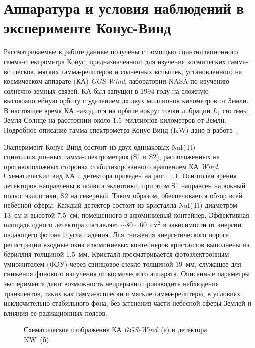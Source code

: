 \chapter{Аппаратура и условия наблюдений в эксперименте Конус-Винд}\label{KW_description}

Рассматриваемые в работе данные получены с помощью сцинтилляционного гамма-спектрометра 
Конус, предназначенного для изучения космических гамма-всплесков, мягких гамма-репитеров и солнечных вспышек,
установленного на космическом аппарате (КА) \textit{GGS-Wind}, лаборатории NASA по изучению 
солнечно-земных связей. КА был запущен в 1994 году на сложную высокоапогейную орбиту 
с удалением до двух миллионов километров от Земли. В настоящее время КА находится 
на орбите вокруг точки либрации $L_1$ системы Земля-Солнце на расстоянии около 1.5~миллионов километров от Земли.
Подробное описание гамма-спектрометра Конус-Винд (KW) дано в работе~\citep{Aptekar_1995SSR}.

Эксперимент Конус-Винд состоит из двух одинаковых NaI(Tl) сцинтилляционных 
гамма-спектрометров (S1 и S2), расположенных на противоположных сторонах 
стабилизированного вращением КА \textit{Wind}. 
Схематический вид КА и детектора приведён на рис.~\ref{img:KW_main_view}.
Оси полей зрения детекторов 
направлены в полюса эклиптики, при этом S1 направлен на южный полюс эклиптики, 
S2 на северный. Таким образом, обеспечивается обзор всей небесной сферы. 
Каждый детектор состоит из кристалла NaI(Tl) диаметром 13~см и высотой 7.5~см, 
помещенного в алюминиевый контейнер.
Эффективная площадь одного детектора составляет $\sim 80\textrm{--}160$~см$^2$ в 
зависимости от энергии падающего фотона и угла падения.  
Для снижения энергетического порога регистрации входные окна алюминиевых 
контейнеров кристаллов выполнены из бериллия толщиной 1.5~мм. 
Кристалл просматривается фотоэлектронным 
умножителем (ФЭУ) через свинцовое стекло толщиной 19~мм, служащее для снижения фонового 
излучения от космического аппарата. Описанные параметры эксперимента дают 
возможность непрерывно производить наблюдения транзиентов, таких как гамма-всплески 
и мягкие гамма-репитеры, в условиях исключительно стабильного фона, 
без затенения части небесной сферы Землей и влияния ее радиационных поясов. 

\begin{figure}[h]
  \begin{minipage}[b]{0.5\textwidth}
  \end{minipage}
  \hfill
  \begin{minipage}[b]{0.5\textwidth}
  \end{minipage}
  \caption[Схематическое изображение КА \textit{GGS-Wind} и детектора KW.]
  {Схематическое изображение КА \textit{GGS-Wind}~(а) и детектора KW~(б).}
  \label{img:KW_main_view}  
\end{figure}

